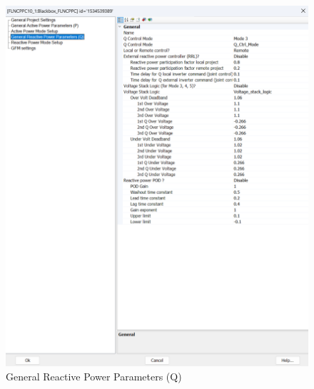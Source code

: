 \documentclass{../grid-link-report}
\begin{document}
		\begin{figure}[H]
		\centering
		\includegraphics[width=\textwidth]{report-assets/images/General Reactive Power Parameters (Q).png}
		\caption{General Reactive Power Parameters (Q)}
		\label{fig:General Reactive Power Parameters (Q)}
	\end{figure}
	
\end{document}
